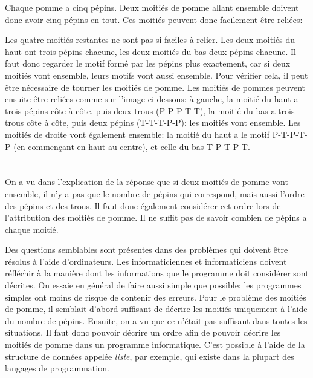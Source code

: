 {{{\centering%
\par}

Chaque pomme a cinq pépins. Deux moitiés de pomme allant ensemble doivent donc avoir cinq pépins en tout. Ces moitiés peuvent donc facilement être reliées:

{\centering%
\par}

Les quatre moitiés restantes ne sont pas si faciles à relier. Les deux moitiés du haut ont trois pépins chacune, les deux moitiés du bas deux pépins chacune. Il faut donc regarder le motif formé par les pépins plus exactement, car si deux moitiés vont ensemble, leurs motifs vont aussi ensemble. Pour vérifier cela, il peut être nécessaire de tourner les moitiés de pomme. Les moitiés de pommes peuvent ensuite être reliées comme sur l’image ci-dessous: à gauche, la moitié du haut a trois pépins côte à côte, puis deux trous (P-P-P-T-T), la moitié du bas a trois trous côte à côte, puis deux pépins (T-T-T-P-P): les moitiés vont ensemble. Les moitiés de droite vont également ensemble: la moitié du haut a le motif P-T-P-T-P (en commençant en haut au centre), et celle du bas T-P-T-P-T.

{\centering%
\par}



\section*{\BrochureItsInformatics}
On a vu dans l’explication de la réponse que si deux moitiés de pomme vont ensemble, il n’y a pas que le nombre de pépins qui correspond, mais aussi l’ordre des pépins et des trous. Il faut donc également considérer cet ordre lors de l’attribution des moitiés de pomme. Il ne suffit pas de savoir combien de pépins a chaque moitié.

Des questions semblables sont présentes dans des problèmes qui doivent être résolus à l’aide d’ordinateurs. Les informaticiennes et informaticiens doivent réfléchir à la manière dont les informations que le programme doit considérer sont décrites. On essaie en général de faire aussi simple que possible: les programmes simples ont moins de risque de contenir des erreurs. Pour le problème des moitiés de pomme, il semblait d’abord suffisant de décrire les moitiés uniquement à l’aide du nombre de pépins. Ensuite, on a vu que ce n’était pas suffisant dans toutes les situations. Il faut donc pouvoir décrire un ordre afin de pouvoir décrire les moitiés de pomme dans un programme informatique. C’est possible à l’aide de la structure de données appelée \emph{liste}, par exemple, qui existe dans la plupart des langages de programmation.



}}

